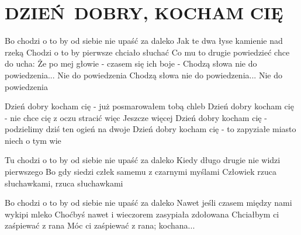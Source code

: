 \documentclass[../../../songbook.tex]{subfiles}
\begin{document}
\TabPositions{8cm} %
\section*{DZIEŃ DOBRY, KOCHAM CIĘ}
{}
\vspace{0.5cm}
Bo chodzi o to by od siebie nie upaść za daleko 		 \newline
Jak te dwa łyse kamienie nad rzeką  \newline
Chodzi o to by pierwsze chciało słuchać  \newline
Co mu to drugie powiedzieć chce do ucha:  \newline
Że po mej głowie - czasem się ich boje -  \newline
Chodzą słowa nie do powiedzenia... Nie do powiedzenia  \newline
Chodzą słowa nie do powiedzenia... Nie do powiedzenia  \newline

\-\hspace{1cm} Dzień dobry kocham cię - już posmarowałem tobą chleb 	\quad {} \newline
\-\hspace{1cm} Dzień dobry kocham cię - nie chce cię z oczu stracić więc  \newline
\-\hspace{1cm} Jeszcze więcej  \newline
\-\hspace{1cm} Dzień dobry kocham cię - podzielimy dziś ten ogień na dwoje  \newline
\-\hspace{1cm} Dzień dobry kocham cię - to zapyziałe miasto niech o tym wie  \newline

Tu chodzi o to by od siebie nie upaść za daleko  \newline
Kiedy długo drugie nie widzi pierwszego  \newline
Bo gdy siedzi człek samemu z czarnymi myślami  \newline
Człowiek rzuca słuchawkami, rzuca słuchawkami  \newline

Bo chodzi o to by od siebie nie upaść za daleko  \newline
Nawet jeśli czasem między nami wykipi mleko  \newline
Choćbyś nawet i wieczorem zasypiała zdołowana  \newline
Chciałbym ci zaśpiewać z rana  \newline
Móc ci zaśpiewać z rana; kochana...  \newline
\end{document}
